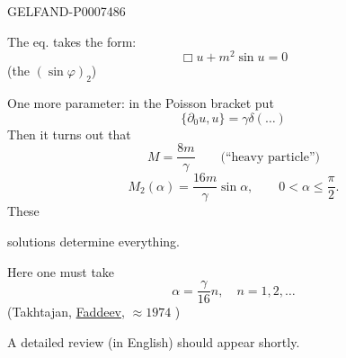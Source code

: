 \begin{GelfandAdjacentEvidence}{GELFAND-P000748}{6}

The eq. takes the form:
\begin{equation*}
\Box u+m^2\sin u=0
\tag{20}
\end{equation*}
(the \((\sin\varphi)_2\))

One more parameter: in the Poisson bracket put
\begin{equation*}
\{\partial_0u,u\}=\gamma\delta(\ldots)
\tag{21}
\end{equation*}
Then it turns out that
\begin{equation*}
M=\frac{8m}{\gamma}\qquad\text{(“heavy particle”)}
\tag{22}
\end{equation*}
\begin{equation*}
M_2(\alpha)=\frac{16m}{\gamma}\sin\alpha,\qquad 0<\alpha\leq\frac{\pi}{2}.
\tag{23}
\end{equation*}
These 
\end{GelfandAdjacentEvidence}

solutions determine everything.

Here one must take
\begin{equation*}
\alpha=\frac{\gamma}{16}n,\quad n=1,2,\ldots
\tag{24}
\end{equation*}
(Takhtajan, \underline{Faddeev}, \(\approx1974\) )

A detailed review (in English) should appear shortly.


